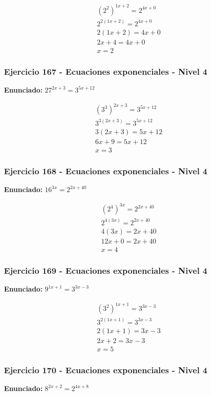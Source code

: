 \documentclass[12pt,a4paper]{article}
\begin{document}
\[
\begin{aligned}
(2^{2})^{1x+2}=2^{4x+0}\\
2^{2(1x+2)}=2^{4x+0}\\
2(1x+2)=4x+0\\
2x+4=4x+0\\
\boxed{x=2}
\end{aligned}
\]


\subsubsection*{Ejercicio 167 - Ecuaciones exponenciales - Nivel 4}
\textbf{Enunciado:} \(27^{2x+3}=3^{5x+12}\)

\[
\begin{aligned}
(3^{3})^{2x+3}=3^{5x+12}\\
3^{3(2x+3)}=3^{5x+12}\\
3(2x+3)=5x+12\\
6x+9=5x+12\\
\boxed{x=3}
\end{aligned}
\]


\subsubsection*{Ejercicio 168 - Ecuaciones exponenciales - Nivel 4}
\textbf{Enunciado:} \(16^{3x}=2^{2x+40}\)

\[
\begin{aligned}
(2^{4})^{3x}=2^{2x+40}\\
2^{4(3x)}=2^{2x+40}\\
4(3x)=2x+40\\
12x+0=2x+40\\
\boxed{x=4}
\end{aligned}
\]


\subsubsection*{Ejercicio 169 - Ecuaciones exponenciales - Nivel 4}
\textbf{Enunciado:} \(9^{1x+1}=3^{3x-3}\)

\[
\begin{aligned}
(3^{2})^{1x+1}=3^{3x-3}\\
3^{2(1x+1)}=3^{3x-3}\\
2(1x+1)=3x-3\\
2x+2=3x-3\\
\boxed{x=5}
\end{aligned}
\]


\subsubsection*{Ejercicio 170 - Ecuaciones exponenciales - Nivel 4}
\textbf{Enunciado:} \(8^{2x+2}=2^{4x+8}\)
\end{document}
